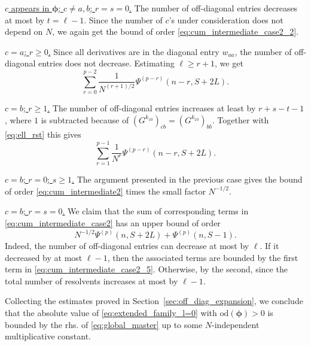 \documentclass[10pt]{amsart}
\numberwithin{equation}{section}
\newcommand{\nc}{\normalcolor}
\begin{document}
\smallskip

\noindent\underline{$c$ appears in $\bm{\phi}$; $c\neq a,b$; $r=s=0$.} The number of off-diagonal entries decreases at most by $t=\ell-1$. Since the number of $c$'s under consideration does not depend on $N$, we again get the bound of order  \eqref{eq:cum_intermediate_case2_2}.

\smallskip

\noindent\underline{$c=a$; $r\ge 0$.} Since all derivatives are in the diagonal entry $w_{aa}$, the number of off-diagonal entries does not decrease. Estimating $\ell\ge r+1$, we get
\begin{equation}
\sum_{r=0}^{p-2} \frac{1}{N^{(r+1)/2}} \Psi^{(p-r)}(n-r,S+2L).
\label{eq:cum_intermediate_case2_3}
\end{equation}

\smallskip

\noindent\underline{$c=b$; $r\ge 1$.} The number of off-diagonal entries increases at least by $r+s-t-1$, where $1$ is subtracted because of $(G^{k_{10}})_{cb}=(G^{k_{10}})_{bb}$. Together with \eqref{eq:ell_rst} this gives
\begin{equation}
\sum_{r=1}^{p-1} \frac{1}{N^r} \Psi^{(p-r)}(n-r,S+2L).
\label{eq:cum_intermediate_case2_4}
\end{equation}

\smallskip

\noindent\underline{$c=b$; $r=0$; $s\ge 1$.} The argument presented in the previous case gives the bound of order \eqref{eq:cum_intermediate2} times the small factor $N^{-1/2}$.

\smallskip

\noindent\underline{$c=b$; $r=s=0$.} We claim that the sum of corresponding terms in \eqref{eq:cum_intermediate_case2} has an upper bound of order
\begin{equation}
N^{-1/2}\Psi^{(p)}(n,S+2L) + \Psi^{(p)}(n,S-1).
\label{eq:cum_intermediate_case2_5}
\end{equation}
Indeed, the number of off-diagonal entries can decrease at most by $\ell$. If it decreased by at most $\ell-1$, then the associated terms are bounded by the first term in \eqref{eq:cum_intermediate_case2_5}. Otherwise, by the second, since the total number of resolvents increases at most by $\ell-1$. 

\smallskip

 Collecting the estimates proved in Section~\ref{sec:off_diag_expansion}, we conclude that the absolute value of \eqref{eq:extended_family_l=0} with ${\mathrm{od}}(\bm{\phi})>0$ is bounded by the rhs. of \eqref{eq:global_master} up to some $N$-independent multiplicative constant.\nc
\end{document}
